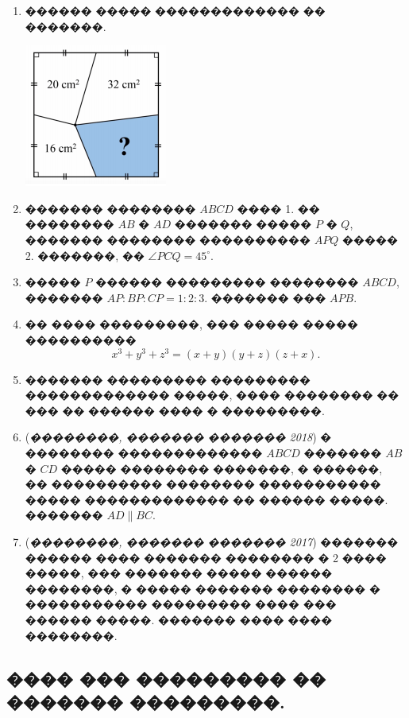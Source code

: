 \documentclass[a4paper,12pt]{article}
\begin{document}
\begin{enumerate}
\item ������ ����� ������������� �� �������.

\includegraphics[scale=1.00]{cap2}

\item ������� �������� $ABCD$ ���� 1. �� �������� $AB$ � $AD$ ������� ����� $P$ � $Q$, ������� �������� ���������� $APQ$ ����� 2. �������, �� $\angle PCQ= 45^{\circ}$.

\item ����� $P$ ������ ��������� �������� $ABCD$, ������� $AP:BP:CP=1:2:3$. ������� ��� $APB$.

\item �� ���� ���������, ��� ����� ����� ���������� $$x^{3}+y^{3}+z^{3}=(x+y)(y+z)(z+x).$$

\item ������� ��������� ��������� ������������� �����, ���� �������� �� ��� �� ������ ���� � ���������.

\item (\textit{��������, ������� ������� 2018}) � �������� ������������� $ABCD$ ������� $AB$ � $CD$ ����� �������� �������, � ������, �� ���������� �������� ����������� ����� ������������� �� ������ �����. ������� $AD\| BC$.

\item (\textit{��������, ������� ������� 2017}) ������� ������ ���� ������� �������� � 2 ���� �����, ��� ������� ����� ������ ��������, � ����� ������� �������� � ����������� ��������� ���� ��� ������ �����. ������� ���� ���� ��������.
\end{enumerate}








\newpage

\begin{center}
\section*{���� ��� ��������� �� ������� ���������.}
\end{center}
\end{document}
